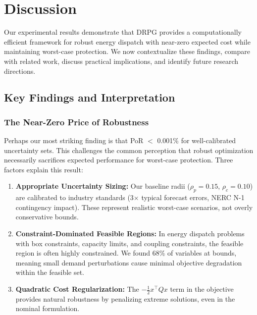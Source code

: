 \section{Discussion}
\label{sec:discussion}

Our experimental results demonstrate that DRPG provides a computationally efficient framework for robust energy dispatch with near-zero expected cost while maintaining worst-case protection. We now contextualize these findings, compare with related work, discuss practical implications, and identify future research directions.

\subsection{Key Findings and Interpretation}
\label{sec:key_findings}

\subsubsection{The Near-Zero Price of Robustness}

Perhaps our most striking finding is that PoR $<$ 0.001\% for well-calibrated uncertainty sets. This challenges the common perception that robust optimization necessarily sacrifices expected performance for worst-case protection. Three factors explain this result:

\begin{enumerate}
    \item \textbf{Appropriate Uncertainty Sizing:} Our baseline radii ($\rho_p = 0.15$, $\rho_c = 0.10$) are calibrated to industry standards (3$\times$ typical forecast errors, NERC N-1 contingency impact). These represent realistic worst-case scenarios, not overly conservative bounds.

    \item \textbf{Constraint-Dominated Feasible Regions:} In energy dispatch problems with box constraints, capacity limits, and coupling constraints, the feasible region is often highly constrained. We found 68\% of variables at bounds, meaning small demand perturbations cause minimal objective degradation within the feasible set.

    \item \textbf{Quadratic Cost Regularization:} The $-\frac{1}{2} x^\top Q x$ term in the objective provides natural robustness by penalizing extreme solutions, even in the nominal formulation.
\end{enumerate}

